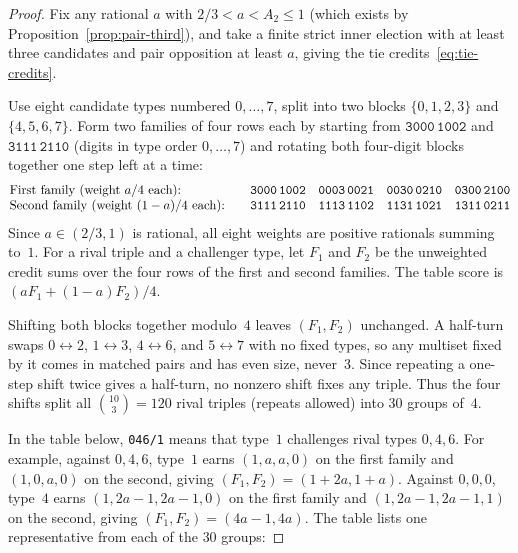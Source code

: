 \documentclass[11pt,letterpaper]{article}
\theoremstyle{cleanthm}
\begin{document}
\begin{proof}
Fix any rational \(a\) with \(2/3<a<A_2\le 1\) (which exists by
Proposition~\ref{prop:pair-third}), and take a finite strict inner election with at least three
candidates and pair opposition at least \(a\), giving the tie credits~\eqref{eq:tie-credits}.

Use eight candidate types numbered \(0,\ldots,7\), split into two blocks \(\{0,1,2,3\}\) and
\(\{4,5,6,7\}\). Form two families of four rows each by starting from \(\mathtt{3000\,1002}\) and
\(\mathtt{3111\,2110}\) (digits in type order \(0,\ldots,7\)) and rotating both four-digit blocks
together one step left at a time:
\[
\begin{array}{@{}l@{\qquad}cccc@{}}
 \text{First family (weight } a/4 \text{ each):}
   & \mathtt{3000\,1002} & \mathtt{0003\,0021} & \mathtt{0030\,0210} & \mathtt{0300\,2100}\\
 \text{Second family (weight } (1-a)/4 \text{ each):}
   & \mathtt{3111\,2110} & \mathtt{1113\,1102} & \mathtt{1131\,1021} & \mathtt{1311\,0211}
\end{array}
\]
Since \(a\in(2/3,1)\) is rational, all eight weights are positive rationals summing to~\(1\). For
a rival triple and a challenger type, let \(F_1\) and \(F_2\) be the unweighted credit sums over
the four rows of the first and second families. The table score is \((aF_1+(1-a)F_2)/4\).

Shifting both blocks together modulo~\(4\) leaves \((F_1,F_2)\) unchanged. A half-turn swaps
\(0\leftrightarrow 2\), \(1\leftrightarrow 3\), \(4\leftrightarrow 6\), and \(5\leftrightarrow 7\)
with no fixed types, so any multiset fixed by it comes in matched pairs and has even size,
never~\(3\). Since repeating a one-step shift twice gives a half-turn, no nonzero shift fixes any
triple. Thus the four shifts split all \(\binom{10}{3}=120\) rival triples (repeats allowed) into
\(30\) groups of~\(4\).

In the table below, \texttt{046/1} means that type~\(1\) challenges rival types \(0,4,6\). For
example, against \(0,4,6\), type~\(1\) earns \((1,a,a,0)\) on the first family and \((1,0,a,0)\)
on the second, giving \((F_1,F_2)=(1+2a,1+a)\). Against \(0,0,0\), type~\(4\) earns
\((1,2a-1,2a-1,0)\) on the first family and \((1,2a-1,2a-1,1)\) on the second, giving
\((F_1,F_2)=(4a-1,4a)\). The table lists one representative from each of the \(30\) groups:


\end{proof}
\end{document}

